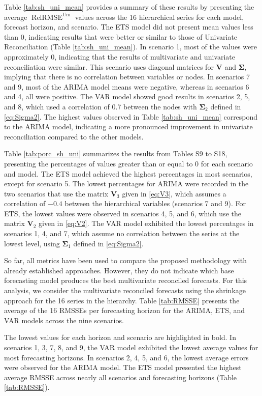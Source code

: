 \documentclass[a4paper,preprint,11pt,authoryear]{elsarticle}
\DeclareMathOperator{\RelRMSE}{RelRMSE}
\DeclareMathOperator{\Uni}{Uni}
\begin{document}
Table \ref{tab:sh_uni_mean} provides a summary of these results by presenting the average $\RelRMSE^{\Uni}$ values across the 16 hierarchical series for each model, forecast horizon, and scenario. The ETS model did not present mean values less than 0, indicating results that were better or similar to those of Univariate Reconciliation (Table \ref{tab:sh_uni_mean}). In scenario 1, most of the values were approximately 0, indicating that the results of multivariate and univariate reconciliation were similar. This scenario uses diagonal matrices for $\bm{V}$ and $\bm{\Sigma}$, implying that there is no correlation between variables or nodes. In scenarios 7 and 9, most of the ARIMA model means were negative, whereas in scenarios 6 and 4, all were positive. The VAR model showed good results in scenarios 2, 5, and 8, which used a correlation of 0.7 between the nodes with $\bm{\Sigma}_2$ defined in \eqref{eq:Sigma2}. The highest values observed in Table \ref{tab:sh_uni_mean} correspond to the ARIMA model, indicating a more pronounced improvement in univariate reconciliation compared to the other models.

Table \ref{tab:porc_sh_uni} summarizes the results from Tables S9 to S18, presenting the percentages of values greater than or equal to 0 for each scenario and model. The ETS model achieved the highest percentages in most scenarios, except for scenario 5. The lowest percentages for ARIMA were recorded in the two scenarios that use the matrix $\bm{V}_3$ given in \eqref{eq:V3}, which assumes a correlation of $-0.4$ between the hierarchical variables (scenarios 7 and 9). For ETS, the lowest values were observed in scenarios 4, 5, and 6, which use the matrix $\bm{V}_2$ given in \eqref{eq:V2}. The VAR model exhibited the lowest percentages in scenarios 1, 4, and 7, which assume no correlation between the series at the lowest level, using $\bm{\Sigma}_1$ defined in \eqref{eq:Sigma2}.

So far, all metrics have been used to compare the proposed methodology with already established approaches. However, they do not indicate which base forecasting model produces the best multivariate reconciled forecasts. For this analysis, we consider the multivariate reconciled forecasts using the shrinkage approach for the 16 series in the hierarchy. Table \ref{tab:RMSSE} presents the average of the 16 RMSSEs per forecasting horizon for the ARIMA, ETS, and VAR models across the nine scenarios.

The lowest values for each horizon and scenario are highlighted in bold. In scenarios 1, 3, 7, 8, and 9, the VAR model exhibited the lowest average values for most forecasting horizons. In scenarios 2, 4, 5, and 6, the lowest average errors were observed for the ARIMA model. The ETS model presented the highest average RMSSE across nearly all scenarios and forecasting horizons (Table \ref{tab:RMSSE}).
\end{document}
